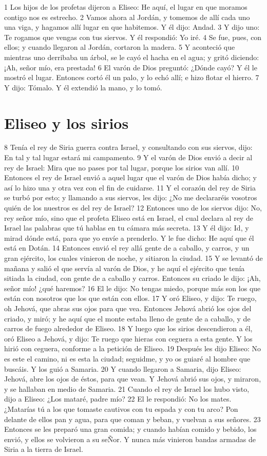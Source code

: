 1 Los hijos de los profetas dijeron a Eliseo: He aquí, el lugar en que moramos contigo nos es estrecho.
2 Vamos ahora al Jordán, y tomemos de allí cada uno una viga, y hagamos allí lugar en que habitemos. Y él dijo: Andad.
3 Y dijo uno: Te rogamos que vengas con tus siervos. Y él respondió: Yo iré.
4 Se fue, pues, con ellos; y cuando llegaron al Jordán, cortaron la madera.
5 Y aconteció que mientras uno derribaba un árbol, se le cayó el hacha en el agua; y gritó diciendo: ¡Ah, señor mío, era prestada!
6 El varón de Dios preguntó: ¿Dónde cayó? Y él le mostró el lugar. Entonces cortó él un palo, y lo echó allí; e hizo flotar el hierro.
7 Y dijo: Tómalo. Y él extendió la mano, y lo tomó.
\section*{Eliseo y los sirios}

8 Tenía el rey de Siria guerra contra Israel, y consultando con sus siervos, dijo: En tal y tal lugar estará mi campamento.
9 Y el varón de Dios envió a decir al rey de Israel: Mira que no pases por tal lugar, porque los sirios van allí.
10 Entonces el rey de Israel envió a aquel lugar que el varón de Dios había dicho; y así lo hizo una y otra vez con el fin de cuidarse.
11 Y el corazón del rey de Siria se turbó por esto; y llamando a sus siervos, les dijo: ¿No me declararéis vosotros quién de los nuestros es del rey de Israel?
12 Entonces uno de los siervos dijo: No, rey señor mío, sino que el profeta Eliseo está en Israel, el cual declara al rey de Israel las palabras que tú hablas en tu cámara más secreta.
13 Y él dijo: Id, y mirad dónde está, para que yo envíe a prenderlo. Y le fue dicho: He aquí que él está en Dotán.
14 Entonces envió el rey allá gente de a caballo, y carros, y un gran ejército, los cuales vinieron de noche, y sitiaron la ciudad.
15 Y se levantó de mañana y salió el que servía al varón de Dios, y he aquí el ejército que tenía sitiada la ciudad, con gente de a caballo y carros. Entonces su criado le dijo: ¡Ah, señor mío! ¿qué haremos?
16 El le dijo: No tengas miedo, porque más son los que están con nosotros que los que están con ellos.
17 Y oró Eliseo, y dijo: Te ruego, oh Jehová, que abras sus ojos para que vea. Entonces Jehová abrió los ojos del criado, y miró; y he aquí que el monte estaba lleno de gente de a caballo, y de carros de fuego alrededor de Eliseo.
18 Y luego que los sirios descendieron a él, oró Eliseo a Jehová, y dijo: Te ruego que hieras con ceguera a esta gente. Y los hirió con ceguera, conforme a la petición de Eliseo.
19 Después les dijo Eliseo: No es este el camino, ni es esta la ciudad; seguidme, y yo os guiaré al hombre que buscáis. Y los guió a Samaria.
20 Y cuando llegaron a Samaria, dijo Eliseo: Jehová, abre los ojos de éstos, para que vean. Y Jehová abrió sus ojos, y miraron, y se hallaban en medio de Samaria.
21 Cuando el rey de Israel los hubo visto, dijo a Eliseo: ¿Los mataré, padre mío?
22 El le respondió: No los mates. ¿Matarías tú a los que tomaste cautivos con tu espada y con tu arco? Pon delante de ellos pan y agua, para que coman y beban, y vuelvan a sus señores.
23 Entonces se les preparó una gran comida; y cuando habían comido y bebido, los envió, y ellos se volvieron a su seÑor. Y nunca más vinieron bandas armadas de Siria a la tierra de Israel.
